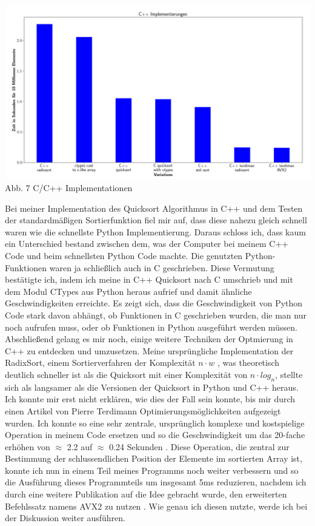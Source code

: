 \documentclass[10pt,a4paper]{article}
\begin{document}
\begin{center}
    \hspace*{-1.5cm}\includegraphics[width=1.2\textwidth]{./diagramme/matplotlib/cpp.png}
    Abb. 7 C/C++ Implementationen
\end{center}

Bei meiner Implementation des Quicksort Algorithmus in C++ und dem Testen der standardmäßigen Sortierfunktion
fiel mir auf, dass diese nahezu gleich schnell waren wie die schnellste Python Implementierung.
Daraus schloss ich, dass kaum ein Unterschied bestand zwischen dem, was der Computer bei meinem C++ Code und beim schnellsten Python Code machte.
Die genutzten Python-Funktionen waren ja schließlich auch in C geschrieben. Diese Vermutung bestätigte ich, indem
ich meine in C++ Quicksort nach C umschrieb und mit dem Modul CTypes aus Python heraus aufrief und damit ähnliche Geschwindigkeiten
erreichte. Es zeigt sich, dass die Geschwindigkeit von Python Code stark davon abhängt, ob Funktionen in C geschrieben wurden,
die man nur noch aufrufen muss, oder ob Funktionen in Python ausgeführt werden müssen.
Abschließend gelang es mir noch, einige weitere Techniken der Optmierung in C++ zu entdecken und umzusetzen.
Meine ursprüngliche Implementation der RadixSort, einem Sortierverfahren der Komplexität $n \cdot w$ , was theoretisch deutlich schneller ist als die Quicksort
mit einer Komplexität von $n \cdot log_{n}$, stellte sich als langsamer als die Versionen  der Quicksort in Python und C++ heraus.
Ich konnte mir erst nicht erklären, wie dies der Fall sein konnte, bis mir durch einen Artikel von Pierre Terdimann Optimierungsmöglichkeiten
aufgezeigt wurden. Ich konnte so eine sehr zentrale, ursprünglich komplexe und kostspielige Operation in meinem Code ersetzen
und so die Geschwindigkeit um das 20-fache erhöhen von $\approx$ 2.2 auf $\approx$ 0.24 Sekunden \cite{terdiman}.
Diese Operation, die zentral zur Bestimmung der schlussendlichen Position der Elemente im sortierten Array ist, konnte ich nun in einem Teil meines Programms noch weiter verbessern und so die Ausführung dieses Programmteils
um insgesamt 5ms reduzieren, nachdem ich durch eine weitere Publikation auf die Idee gebracht wurde, den erweiterten Befehlssatz namens
AVX2 zu nutzen \cite{michael}. Wie genau ich diesen nutzte, werde ich bei der Diskussion weiter ausführen.
\end{document}
